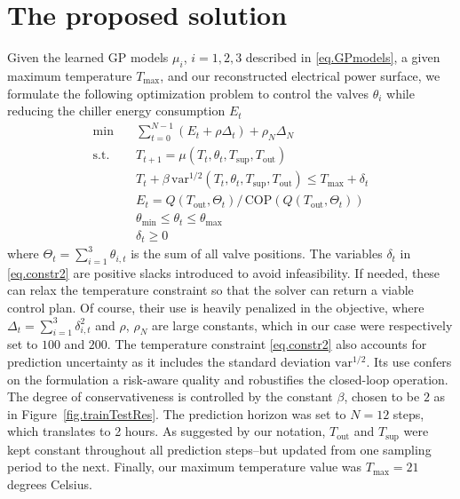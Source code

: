 \section{The proposed solution}


Given the learned GP models $\mu_i$, $i=1,2,3$ described in \eqref{eq.GPmodels}, a given maximum temperature $T_{\max}$, and our reconstructed electrical power surface, we formulate the following optimization problem to control the valves $\theta_i$ while reducing the chiller energy consumption $E_t$
\begin{subequations}
	\begin{align}
		\min & \quad \sum_{t=0}^{N-1}  \left(E_t + \rho \Delta_t \right) + \rho_N \Delta_N\\
		\text{s.t.}
		& \quad T_{t+1} = \mu(T_t,\theta_t,T_{\text{sup}},T_{\text{out}}) \label{eq.constr1} \\
		& \quad T_t + \beta \, \text{var}^{1/2} (T_t,\theta_t,T_{\text{sup}},T_{\text{out}}) \leq T_\text{max} + \delta_t \label{eq.constr2} \\
		& \quad E_t = Q(T_\text{out},\Theta_t) / \, \text{COP}(Q(T_\text{out},\Theta_t)) \label{eq.constr3} \\
		& \quad \theta_{\text{min}} \leq \theta_t \leq \theta_{\text{max}} \label{eq.constr4} \\
		& \quad \delta_t \geq 0 \label{eq.constr5}
	\end{align}
	\label{eq.optControlProb}%
\end{subequations}
where $\Theta_t = \sum_{i=1}^{3} \theta_{i,t}$ is the sum of all valve positions. The variables $\delta_t$ in \eqref{eq.constr2} are positive slacks introduced to avoid infeasibility. If needed, these can relax the temperature constraint so that the solver can return a viable control plan. Of course, their use is heavily penalized in the objective, where $\Delta_t = \sum_{i=1}^{3} \delta_{i,t}^2$ and $\rho$, $\rho_N$ are large constants, which in our case were respectively set to $100$ and $200$. The temperature constraint \eqref{eq.constr2} also accounts for prediction uncertainty as it includes the standard deviation $\text{var}^{1/2}$. Its use confers on the formulation a risk-aware quality and robustifies the closed-loop operation. The degree of conservativeness is controlled by the constant $\beta$, chosen to be $2$ as in Figure~\ref{fig.trainTestRes}. The prediction horizon was set to $N=12$ steps, which translates to 2 hours. As suggested by our notation, $T_\text{out}$ and $T_\text{sup}$ were kept constant throughout all prediction steps--but updated from one sampling period to the next. Finally, our maximum temperature value was $T_{\max} = 21$ degrees Celsius.

